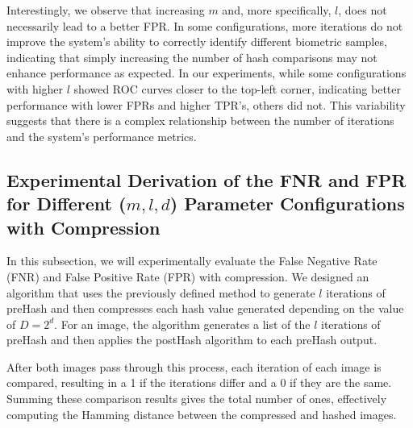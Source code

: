 Interestingly, we observe that increasing \(m\) and, more specifically, \(l\), does not necessarily lead to a better FPR. In some configurations, more iterations do not improve the system's ability to correctly identify different biometric samples, indicating that simply increasing the number of hash comparisons may not enhance performance as expected. In our experiments, while some configurations with higher \(l\) showed ROC curves closer to the top-left corner, indicating better performance with lower FPRs and higher TPR's, others did not. This variability suggests that there is a complex relationship between the number of iterations and the system's performance metrics.

\subsection{Experimental Derivation of the FNR and FPR for Different (\(m, l, d\)) Parameter Configurations with Compression}

In this subsection, we will experimentally evaluate the False Negative Rate (FNR) and False Positive Rate (FPR) with compression. We designed an algorithm that uses the previously defined method to generate \( l \) iterations of preHash and then compresses each hash value generated depending on the value of \(D = 2^d\). For an image, the algorithm generates a list of the \( l \) iterations of preHash and then applies the postHash algorithm to each preHash output.

After both images pass through this process, each iteration of each image is compared, resulting in a 1 if the iterations differ and a 0 if they are the same. Summing these comparison results gives the total number of ones, effectively computing the Hamming distance between the compressed and hashed images.

